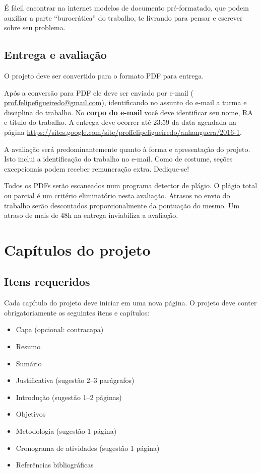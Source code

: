 \documentclass[a4paper]{article}
\begin{document}
É fácil encontrar na internet modelos de documento pré-formatado, que podem auxiliar a parte ``burocrática'' do trabalho, te livrando para pensar e escrever sobre seu problema.

\subsection{Entrega e avaliação}

O projeto deve ser convertido para o formato PDF para entrega.

Após a conversão para PDF ele deve ser enviado por e-mail ( \url{prof.felipefigueiredo@gmail.com}), identificando no assunto do e-mail a turma e disciplina do trabalho.
No {\bf corpo do e-mail} você deve identificar seu nome, RA e título do trabalho.
A entrega deve ocorrer até 23:59 da data agendada na página \url{https://sites.google.com/site/proffelipefigueiredo/anhanguera/2016-1}.

A avaliação será predominantemente quanto à forma e apresentação do projeto.
Isto inclui a identificação do trabalho no e-mail.
Como de costume, seções excepcionais podem receber remuneração extra.
Dedique-se!

Todos os PDFs serão escaneados num programa detector de plágio.
O plágio total ou parcial é um critério eliminatório nesta avaliação.
Atrasos no envio do trabalho serão descontados proporcionalmente da pontuação do mesmo.
Um atraso de mais de 48h na entrega inviabiliza a avaliação.

\section{Capítulos do projeto}

\subsection{Itens requeridos}

Cada capítulo do projeto deve iniciar em uma nova página.
O projeto deve conter obrigatoriamente os seguintes itens e capítulos:

\begin{itemize}
\item Capa (opcional: contracapa)
\item Resumo
\item Sumário
\item Justificativa (sugestão 2--3 parágrafos)
\item Introdução (sugestão 1--2 páginas)
\item Objetivos
\item Metodologia (sugestão 1 página)
\item Cronograma de atividades (sugestão 1 página)
\item Referências bibliográficas
\end{itemize}
\end{document}
